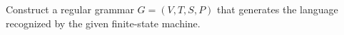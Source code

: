 \documentclass[../main.tex]{subfiles}
\begin{document}
Construct a regular grammar $G = (V, T, S, P)$ that generates the language recognized by the given finite-state machine.

\solution
\end{document}
